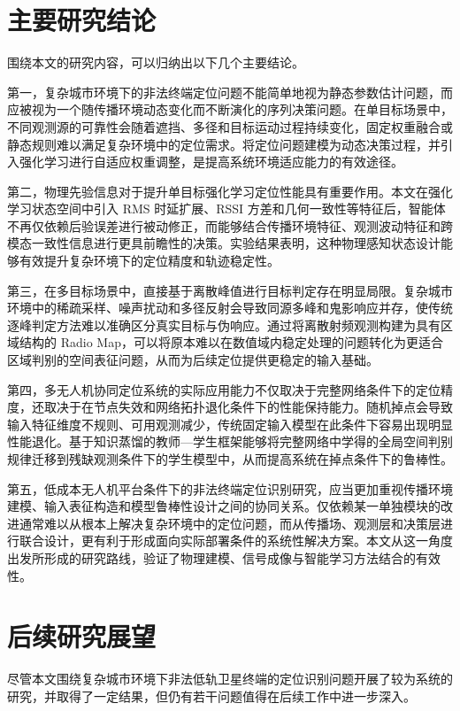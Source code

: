 \section{主要研究结论}
\label{sec:5_2}

围绕本文的研究内容，可以归纳出以下几个主要结论。

第一，复杂城市环境下的非法终端定位问题不能简单地视为静态参数估计问题，而应被视为一个随传播环境动态变化而不断演化的序列决策问题。在单目标场景中，不同观测源的可靠性会随着遮挡、多径和目标运动过程持续变化，固定权重融合或静态规则难以满足复杂环境中的定位需求。将定位问题建模为动态决策过程，并引入强化学习进行自适应权重调整，是提高系统环境适应能力的有效途径。

第二，物理先验信息对于提升单目标强化学习定位性能具有重要作用。本文在强化学习状态空间中引入 RMS 时延扩展、RSSI 方差和几何一致性等特征后，智能体不再仅依赖后验误差进行被动修正，而能够结合传播环境特征、观测波动特征和跨模态一致性信息进行更具前瞻性的决策。实验结果表明，这种物理感知状态设计能够有效提升复杂环境下的定位精度和轨迹稳定性。

第三，在多目标场景中，直接基于离散峰值进行目标判定存在明显局限。复杂城市环境中的稀疏采样、噪声扰动和多径反射会导致同源多峰和鬼影响应并存，使传统逐峰判定方法难以准确区分真实目标与伪响应。通过将离散射频观测构建为具有区域结构的 Radio Map，可以将原本难以在数值域内稳定处理的问题转化为更适合区域判别的空间表征问题，从而为后续定位提供更稳定的输入基础。

第四，多无人机协同定位系统的实际应用能力不仅取决于完整网络条件下的定位精度，还取决于在节点失效和网络拓扑退化条件下的性能保持能力。随机掉点会导致输入特征维度不规则、可用观测减少，传统固定输入模型在此条件下容易出现明显性能退化。基于知识蒸馏的教师—学生框架能够将完整网络中学得的全局空间判别规律迁移到残缺观测条件下的学生模型中，从而提高系统在掉点条件下的鲁棒性。

第五，低成本无人机平台条件下的非法终端定位识别研究，应当更加重视传播环境建模、输入表征构造和模型鲁棒性设计之间的协同关系。仅依赖某一单独模块的改进通常难以从根本上解决复杂环境中的定位问题，而从传播场、观测层和决策层进行联合设计，更有利于形成面向实际部署条件的系统性解决方案。本文从这一角度出发所形成的研究路线，验证了物理建模、信号成像与智能学习方法结合的有效性。

\section{后续研究展望}
\label{sec:5_3}

尽管本文围绕复杂城市环境下非法低轨卫星终端的定位识别问题开展了较为系统的研究，并取得了一定结果，但仍有若干问题值得在后续工作中进一步深入。

